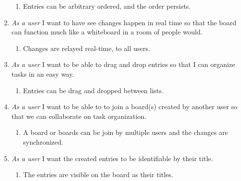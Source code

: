 \documentclass{article}
\begin{document}
\begin{enumerate}
		\begin{enumerate}
			\item Entries can be arbitrary ordered, and the order persists. 
		\end{enumerate}
	\item \emph{As a user} I want to have see changes happen in real time so that the board can function much like a whiteboard in a room of people would.
		\begin{enumerate}
			\item Changes are relayed real-time, to all users.
		\end{enumerate}
	\item \emph{As a user} I want to be able to drag and drop entries so that I can organize tasks in an easy way.
		\begin{enumerate}
			\item Entries can be drag and dropped between lists.
		\end{enumerate}
		\item \emph{As a user} I want to be able to to join a board(s) created by another user so that we can collaborate on task organization.
			\begin{enumerate}
				\item A board or boards can be join by multiple users and the changes are synchronized.
			\end{enumerate}
		\item \emph{As a user} I want the created entries to be identifiable by their title.
			\begin{enumerate}
				\item The entries are visible on the board as their titles.
			\end{enumerate}
	\end{enumerate}
		
\end{document}
